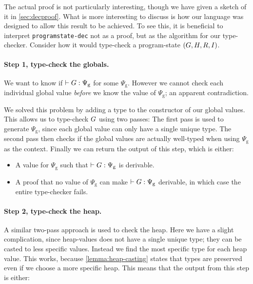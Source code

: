 \begin{code}
\> \AgdaSymbol{:}     \AgdaSymbol{(}  \AgdaSymbol{)}\<%
\end{code}

The actual proof is not particularly interesting, though we have given a sketch
of it in \cref{sec:decproof}. What is more interesting to discuss is how our
language was designed to allow this result to be achieved. To see this, it is
beneficial to interpret \texttt{programstate-dec} not as a proof, but as the
algorithm for our type-checker. Consider how it would type-check a program-state
$(G, H, R, I)$.

\paragraph{Step 1, type-check the globals.} We want to know if
$|- {G} : {\Psi_{\mathrm{g}}}$ for some $\Psi_{\mathrm{g}}$. However we
cannot check each individual global value \emph{before} we know the value of
$\Psi_{\mathrm{g}}$; an apparent contradiction.

We solved this problem by adding a type to the constructor of our global
values. This allows us to type-check $G$ using two passes: The first pass
is used to generate $\Psi_{\mathrm{g}}$, since each global value can only have a
single unique type. The second pass then checks if the global values are
actually well-typed when using $\Psi_{\mathrm{g}}$ as the context. Finally we
can return the output of this step, which is either:

\begin{itemize}
\item A value for $\Psi_{\mathrm{g}}$ such that
  $|- {G} : {\Psi_{\mathrm{g}}}$ is derivable.
\item A proof that no value of $\Psi_{\mathrm{g}}$ can make
  $|- {G} : {\Psi_{\mathrm{g}}}$ derivable, in which case the entire
  type-checker fails.
\end{itemize}

\paragraph{Step 2, type-check the heap.} A similar two-pass approach is used to
check the heap. Here we have a slight complication, since heap-values does not
have a single unique type; they can be casted to less specific values. Instead
we find the most specific type for each heap value. This works, because
\cref{lemma:heap-casting} states that types are preserved even if we choose a
more specific heap. This means that the output from this step is either:

